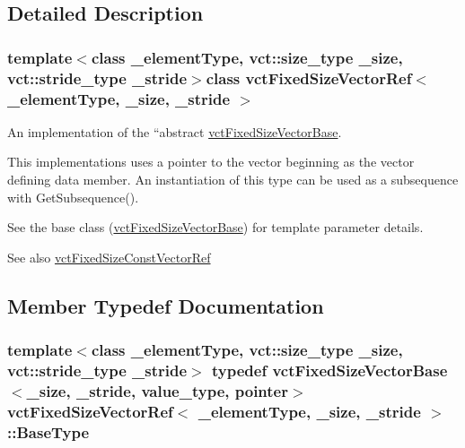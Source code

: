 \subsection{Detailed Description}
\subsubsection*{template$<$class \+\_\+element\+Type, vct\+::size\+\_\+type \+\_\+size, vct\+::stride\+\_\+type \+\_\+stride$>$class vct\+Fixed\+Size\+Vector\+Ref$<$ \+\_\+element\+Type, \+\_\+size, \+\_\+stride $>$}

An implementation of the ``abstract\textquotesingle{}\textquotesingle{} \hyperlink{classvct_fixed_size_vector_base}{vct\+Fixed\+Size\+Vector\+Base}. 

This implementations uses a pointer to the vector beginning as the vector defining data member. An instantiation of this type can be used as a subsequence with Get\+Subsequence().

See the base class (\hyperlink{classvct_fixed_size_vector_base}{vct\+Fixed\+Size\+Vector\+Base}) for template parameter details.

\begin{DoxySeeAlso}{See also}
\hyperlink{classvct_fixed_size_const_vector_ref}{vct\+Fixed\+Size\+Const\+Vector\+Ref} 
\end{DoxySeeAlso}


\subsection{Member Typedef Documentation}
\hypertarget{classvct_fixed_size_vector_ref_a333e56f4164c12e33aff3e491d4fb879}{}
\subsubsection[{Base\+Type}]{\setlength{\rightskip}{0pt plus 5cm}template$<$class \+\_\+element\+Type, vct\+::size\+\_\+type \+\_\+size, vct\+::stride\+\_\+type \+\_\+stride$>$ typedef {\bf vct\+Fixed\+Size\+Vector\+Base}$<$\+\_\+size, \+\_\+stride, value\+\_\+type, pointer$>$ {\bf vct\+Fixed\+Size\+Vector\+Ref}$<$ \+\_\+element\+Type, \+\_\+size, \+\_\+stride $>$\+::{\bf Base\+Type}}\label{classvct_fixed_size_vector_ref_a333e56f4164c12e33aff3e491d4fb879}
\hypertarget{classvct_fixed_size_vector_ref_a43b5dfaa1ac96d6e47aaa9e44b4d7f92}{}
